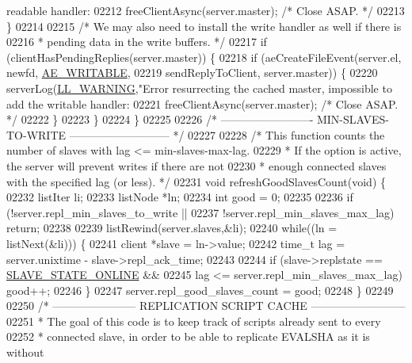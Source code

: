 \begin{DoxyCode}
{{{{{{{{{{{{{{{{{{{{{{{{{{{{{{{{{{{{{{{{{{{{{{{{{{{{{{{{{{{{{{{{{{{{{{{{{{       readable handler: %
02212         freeClientAsync(server.master); \textcolor{comment}{/* Close ASAP. */}
02213     \}
02214 
02215     \textcolor{comment}{/* We may also need to install the write handler as well if there is}
02216 \textcolor{comment}{     * pending data in the write buffers. */}
02217     \textcolor{keywordflow}{if} (clientHasPendingReplies(server.master)) \{
02218         \textcolor{keywordflow}{if} (aeCreateFileEvent(server.el, newfd, \hyperlink{ae_8h_ab6bfb0366ccb6277112d132c2a2bf500}{AE\_WRITABLE},
02219                           sendReplyToClient, server.master)) \{
02220             serverLog(\hyperlink{server_8h_a31229b9334bba7d6be2a72970967a14b}{LL\_WARNING},\textcolor{stringliteral}{"Error resurrecting the cached master, impossible to add
       the writable handler: %
02221             freeClientAsync(server.master); \textcolor{comment}{/* Close ASAP. */}
02222         \}
02223     \}
02224 \}
02225 
02226 \textcolor{comment}{/* ------------------------- MIN-SLAVES-TO-WRITE  --------------------------- */}
02227 
02228 \textcolor{comment}{/* This function counts the number of slaves with lag <= min-slaves-max-lag.}
02229 \textcolor{comment}{ * If the option is active, the server will prevent writes if there are not}
02230 \textcolor{comment}{ * enough connected slaves with the specified lag (or less). */}
02231 \textcolor{keywordtype}{void} refreshGoodSlavesCount(\textcolor{keywordtype}{void}) \{
02232     listIter li;
02233     listNode *ln;
02234     \textcolor{keywordtype}{int} good = 0;
02235 
02236     \textcolor{keywordflow}{if} (!server.repl\_min\_slaves\_to\_write ||
02237         !server.repl\_min\_slaves\_max\_lag) \textcolor{keywordflow}{return};
02238 
02239     listRewind(server.slaves,&li);
02240     \textcolor{keywordflow}{while}((ln = listNext(&li))) \{
02241         client *slave = ln->value;
02242         time\_t lag = server.unixtime - slave->repl\_ack\_time;
02243 
02244         \textcolor{keywordflow}{if} (slave->replstate == \hyperlink{server_8h_ad895fdf16e5ed5275d19ddf8578b900f}{SLAVE\_STATE\_ONLINE} &&
02245             lag <= server.repl\_min\_slaves\_max\_lag) good++;
02246     \}
02247     server.repl\_good\_slaves\_count = good;
02248 \}
02249 
02250 \textcolor{comment}{/* ----------------------- REPLICATION SCRIPT CACHE --------------------------}
02251 \textcolor{comment}{ * The goal of this code is to keep track of scripts already sent to every}
02252 \textcolor{comment}{ * connected slave, in order to be able to replicate EVALSHA as it is without}
}}}}}}}}}}}}}}}}}}}}}}}}}}}}}}}}}}}}}}}}}}}}}}}}}}}}}}}}}}}}}}}}}}}}}}}}}}}
\end{DoxyCode}
